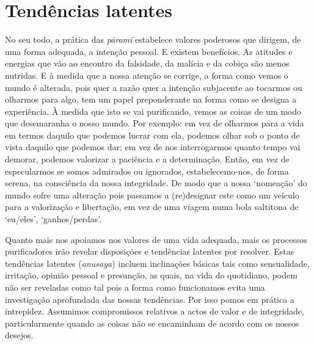 \section{Tendências latentes}

No seu todo, a prática das \emph{pāramī} estabelece valores poderosos que dirigem, de uma forma adequada, a intenção pessoal. E existem benefícios. As atitudes e energias que vão ao encontro da falsidade, da malícia e da cobiça são menos nutridas. E à medida que a nossa atenção se corrige, a forma como vemos o mundo é alterada, pois quer a razão quer a intenção subjacente ao tocarmos ou olharmos para algo, tem um papel preponderante na forma como se designa a experiência. À medida que isto se vai purificando, vemos as coisas de um modo que desemaranha o nosso mundo. Por exemplo: em vez de olharmos para a vida em termos daquilo que podemos lucrar com ela, podemos olhar sob o ponto de vista daquilo que podemos dar; em vez de nos interrogarmos quanto tempo vai demorar, podemos valorizar a paciência e a determinação. Então, em vez de especularmos se somos admirados ou ignorados, estabelecemo-nos, de forma serena, na consciência da nossa integridade. De modo que a nossa `nomeação' do mundo sofre uma alteração pois passamos a (re)designar este como um veículo para a valorização e libertação, em vez de uma viagem numa bola saltitona de `eu/eles', `ganhos/perdas'.

Quanto mais nos apoiamos nos valores de uma vida adequada, mais os processos purificadores irão revelar disposições e tendências latentes por resolver. Estas tendências latentes (\emph{anusaya}) incluem inclinações básicas tais como sensualidade, irritação, opinião pessoal e presunção, as quais, na vida do quotidiano, podem não ser reveladas como tal pois a forma como funcionamos evita uma investigação aprofundada das nossas tendências. Por isso pomos em prática a intrepidez. Assumimos compromissos relativos a actos de valor e de integridade, particularmente quando as coisas não se encaminham de acordo com os nossos desejos.

